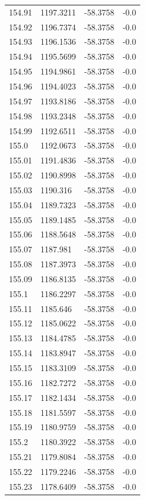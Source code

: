 \begin{table}[H]
\begin{tabular}{llll}
154.91 & 1197.3211 & -58.3758 & -0.0 \\
154.92 & 1196.7374 & -58.3758 & -0.0 \\
154.93 & 1196.1536 & -58.3758 & -0.0 \\
154.94 & 1195.5699 & -58.3758 & -0.0 \\
154.95 & 1194.9861 & -58.3758 & -0.0 \\
154.96 & 1194.4023 & -58.3758 & -0.0 \\
154.97 & 1193.8186 & -58.3758 & -0.0 \\
154.98 & 1193.2348 & -58.3758 & -0.0 \\
154.99 & 1192.6511 & -58.3758 & -0.0 \\
155.0 & 1192.0673 & -58.3758 & -0.0 \\
155.01 & 1191.4836 & -58.3758 & -0.0 \\
155.02 & 1190.8998 & -58.3758 & -0.0 \\
155.03 & 1190.316 & -58.3758 & -0.0 \\
155.04 & 1189.7323 & -58.3758 & -0.0 \\
155.05 & 1189.1485 & -58.3758 & -0.0 \\
155.06 & 1188.5648 & -58.3758 & -0.0 \\
155.07 & 1187.981 & -58.3758 & -0.0 \\
155.08 & 1187.3973 & -58.3758 & -0.0 \\
155.09 & 1186.8135 & -58.3758 & -0.0 \\
155.1 & 1186.2297 & -58.3758 & -0.0 \\
155.11 & 1185.646 & -58.3758 & -0.0 \\
155.12 & 1185.0622 & -58.3758 & -0.0 \\
155.13 & 1184.4785 & -58.3758 & -0.0 \\
155.14 & 1183.8947 & -58.3758 & -0.0 \\
155.15 & 1183.3109 & -58.3758 & -0.0 \\
155.16 & 1182.7272 & -58.3758 & -0.0 \\
155.17 & 1182.1434 & -58.3758 & -0.0 \\
155.18 & 1181.5597 & -58.3758 & -0.0 \\
155.19 & 1180.9759 & -58.3758 & -0.0 \\
155.2 & 1180.3922 & -58.3758 & -0.0 \\
155.21 & 1179.8084 & -58.3758 & -0.0 \\
155.22 & 1179.2246 & -58.3758 & -0.0 \\
155.23 & 1178.6409 & -58.3758 & -0.0 \\

\end{tabular}
\end{table}
